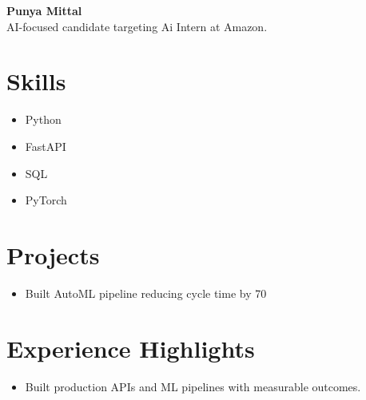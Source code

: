 \documentclass[11pt]{article}
\begin{document}
\begin{center}
{\LARGE \textbf{Punya Mittal}}\\
AI-focused candidate targeting Ai Intern at Amazon.
\end{center}
\section*{Skills}
\begin{itemize}
\item Python \item FastAPI \item SQL \item PyTorch
\end{itemize}
\section*{Projects}
\begin{itemize}
\item Built AutoML pipeline reducing cycle time by 70%
\end{itemize}
\section*{Experience Highlights}
\begin{itemize}
\item Built production APIs and ML pipelines with measurable outcomes.
\end{itemize}
\end{document}
